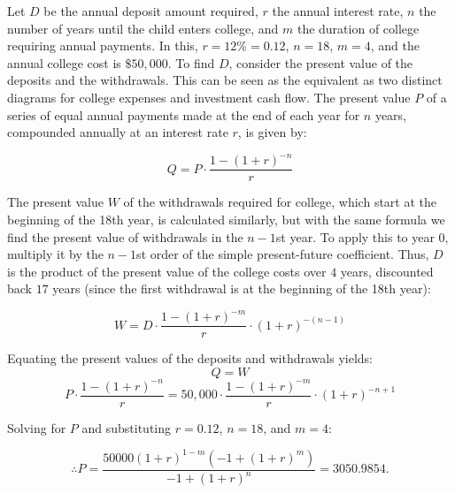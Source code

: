 \documentclass[12pt]{article}
\begin{document}
Let \( D \) be the annual deposit amount required, \( r \) the annual interest rate, \( n \) the number of years until the child enters college, and \( m \) the duration of college requiring annual payments. In this, \( r = 12\% = 0.12 \), \( n = 18 \), \( m = 4 \), and the annual college cost is \( \$50,000 \). To find \( D \), consider the present value of the deposits and the withdrawals. This can be seen as the equivalent as two distinct diagrams for college expenses and investment cash flow.  The present value \( P \) of a series of equal annual payments made at the end of each year for \( n \) years, compounded annually at an interest rate \( r \), is given by:

\[ Q = P \cdot \frac{1 - (1 + r)^{-n}}{r} \]

The present value \( W \) of the withdrawals required for college, which start at the beginning of the 18th year, is calculated similarly, but with the same formula we find the present value of withdrawals in the \(n-1\)st year. To apply this to year \(0\), multiply it by the \(n-1\)st order of the simple present-future coefficient. Thus, \( D \) is the product of the present value of the college costs over \(4\) years, discounted back \(17\) years (since the first withdrawal is at the beginning of the 18th year):

\[ W = D \cdot \frac{1 - (1 + r)^{-m}}{r} \cdot (1 + r)^{-(n-1)} \]

Equating the present values of the deposits and withdrawals yields:
\[Q=W\]
\[ P \cdot \frac{1 - (1 + r)^{-n}}{r} = 50,000 \cdot \frac{1 - (1 + r)^{-m}}{r} \cdot (1 + r)^{-n+1} \]

Solving for \(P\) and substituting \( r = 0.12 \), \( n = 18 \), and \( m = 4 \):


\[\therefore P = \frac{50000(1+r)^{1-m}\left(-1+(1+r)^m\right)}{-1+(1+r)^n} = \boxed{3050.9854}.\]

























\newpage
\end{document}

